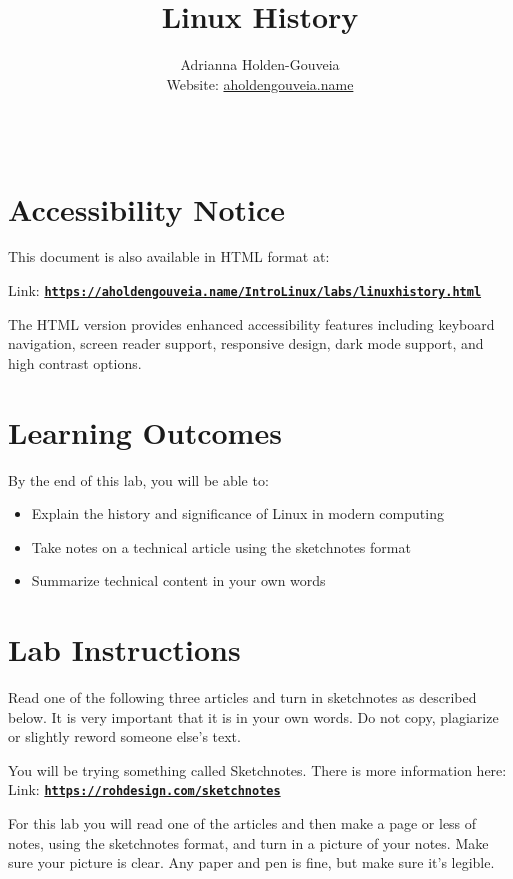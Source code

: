 \documentclass[12pt]{article}
\title{Linux History}
\author{
        Adrianna Holden-Gouveia \\
        Website: \href{https://aholdengouveia.name}{aholdengouveia.name}\\ 
        \date{\vspace{-5ex}}
        \faGithub {: aholdengouveia} \\
        }
\begin{document}
    

\maketitle

\section*{Accessibility Notice}
This document is also available in HTML format at:

Link: \href{https://aholdengouveia.name/IntroLinux/labs/linuxhistory.html}{\textbf{\nolinkurl{https://aholdengouveia.name/IntroLinux/labs/linuxhistory.html}}}

The HTML version provides enhanced accessibility features including keyboard navigation, screen reader support, responsive design, dark mode support, and high contrast options.



\section*{Learning Outcomes}
By the end of this lab, you will be able to:
\begin{itemize}
    \item Explain the history and significance of Linux in modern computing
    \item Take notes on a technical article using the sketchnotes format
    \item Summarize technical content in your own words
\end{itemize}
\section*{Lab Instructions}


Read one of the following three articles and turn in sketchnotes as described below.
It is very important that it is in your own words. Do not copy, plagiarize or slightly reword someone else's text.

You will be trying something called Sketchnotes.  There is more information here: Link: \href{https://rohdesign.com/sketchnotes}{\textbf{\nolinkurl{https://rohdesign.com/sketchnotes}}}

For this lab you will read one of the articles and then make a page or less of notes, using the sketchnotes format, and turn in a picture of your notes.  Make sure your picture is clear. Any paper and pen is fine, but make sure it's legible.
\end{document}
